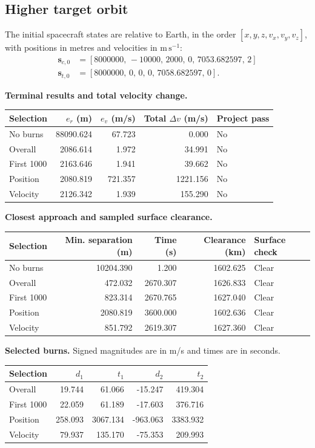 \subsection{Higher target orbit}
The initial spacecraft states are relative to Earth, in the order
$[x,y,z,v_x,v_y,v_z]$, with positions in metres and velocities in
$\mathrm{m\,s^{-1}}$:
\begin{align*}
\mathbf s_{c,0}&=[8000000,\,-10000,\,2000,\,0,\,7053.682597,\,2]\\
\mathbf s_{t,0}&=[8000000,\,0,\,0,\,0,\,7058.682597,\,0].
\end{align*}
\par\noindent\textbf{Terminal results and total velocity change.}
\begin{center}
\begin{tabular}{lrrrl}
\toprule
Selection & $e_r$ (m) & $e_v$ (m/s) & Total $\Delta v$ (m/s) & Project pass\\
\midrule
No burns & 88090.624 & 67.723 & 0.000 & No\\
Overall & 2086.614 & 1.972 & 34.991 & No\\
First 1000 & 2163.646 & 1.941 & 39.662 & No\\
Position & 2080.819 & 721.357 & 1221.156 & No\\
Velocity & 2126.342 & 1.939 & 155.290 & No\\
\bottomrule
\end{tabular}
\end{center}
\par\noindent\textbf{Closest approach and sampled surface clearance.}
\begin{center}
\begin{tabular}{lrrrl}
\toprule
Selection & Min. separation (m) & Time (s) & Clearance (km) & Surface check\\
\midrule
No burns & 10204.390 & 1.200 & 1602.625 & Clear\\
Overall & 472.032 & 2670.307 & 1626.833 & Clear\\
First 1000 & 823.314 & 2670.765 & 1627.040 & Clear\\
Position & 2080.819 & 3600.000 & 1602.636 & Clear\\
Velocity & 851.792 & 2619.307 & 1627.360 & Clear\\
\bottomrule
\end{tabular}
\end{center}
\par\noindent\textbf{Selected burns.} Signed magnitudes are in m/s and times are in seconds.
\begin{center}
\begin{tabular}{lrrrr}
\toprule
Selection & $d_1$ & $t_1$ & $d_2$ & $t_2$\\
\midrule
Overall & 19.744 & 61.066 & -15.247 & 419.304\\
First 1000 & 22.059 & 61.189 & -17.603 & 376.716\\
Position & 258.093 & 3067.134 & -963.063 & 3383.932\\
Velocity & 79.937 & 135.170 & -75.353 & 209.993\\
\bottomrule
\end{tabular}
\end{center}
